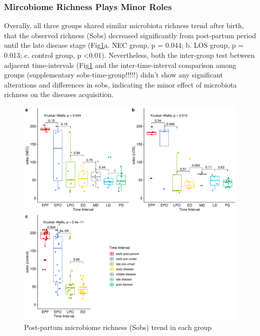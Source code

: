 \documentclass[fleqn,10pt,lineno]{wlpeerj} %
\begin{document}
    \subsubsection*{Mircobiome Richness Plays Minor Roles}
    Overally, all three groups shared similar microbiota richness trend after birth, that the observed richness (Sobs) decreased significantly from post-partum period until the late disease stage (Fig\ref{fig:sobs-group-time}a. NEC group, p = 0.044; b. LOS group, p = 0.013; c. control group, p \textless 0.01). Nevertheless, both the inter-group test between adjacent time-intervals (Fig\ref{fig:sobs-group-time} and the inter-time-interval comparison among groups (supplementary sobs-time-group!!!!!) didn't show any significant alterations and differences in sobs, indicating the minor effect of microbiota richness on the diseases acquisition.
      \begin{figure}[ht]\centering
        \includegraphics[width=\linewidth]{figure/sobs-group-time.pdf}
        \caption{Post-partum microbiome richness (Sobs) trend in each group}
        \label{fig:sobs-group-time}
      \end{figure}
\end{document}
